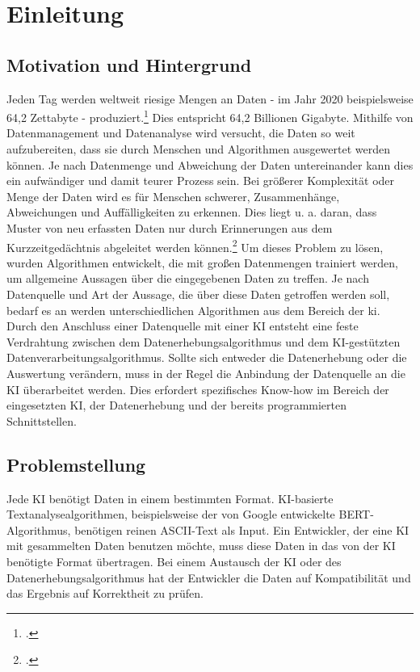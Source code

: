 \section{Einleitung}
\subsection{Motivation und Hintergrund}
Jeden Tag werden weltweit riesige Mengen an Daten - im Jahr 2020 beispielsweise 64,2 Zettabyte - produziert.\footcite{statista2022daten} Dies entspricht 64,2 Billionen Gigabyte. Mithilfe von Datenmanagement und Datenanalyse wird versucht, die Daten so weit aufzubereiten, dass sie durch Menschen und Algorithmen ausgewertet werden können. Je nach Datenmenge und Abweichung der Daten untereinander kann dies ein aufwändiger und damit teurer Prozess sein. Bei größerer Komplexität oder Menge der Daten wird es für Menschen schwerer, Zusammenhänge, Abweichungen und Auffälligkeiten zu erkennen. Dies liegt u. a. daran, dass Muster von neu erfassten Daten nur durch Erinnerungen aus dem Kurzzeitgedächtnis abgeleitet werden können.\footcite{snyder2000music} Um dieses Problem zu lösen, wurden Algorithmen entwickelt, die mit großen Datenmengen trainiert werden, um allgemeine Aussagen über die eingegebenen Daten zu treffen. Je nach Datenquelle und Art der Aussage, die über diese Daten getroffen werden soll, bedarf es an werden unterschiedlichen Algorithmen aus dem Bereich der \ac{ki}. Durch den Anschluss  einer Datenquelle mit einer KI entsteht eine feste Verdrahtung zwischen dem Datenerhebungsalgorithmus und dem KI-gestützten Datenverarbeitungsalgorithmus. Sollte sich entweder die Datenerhebung oder die Auswertung verändern, muss in der Regel die Anbindung der Datenquelle an die KI überarbeitet werden. Dies erfordert spezifisches Know-how im Bereich der eingesetzten KI, der Datenerhebung und der bereits programmierten Schnittstellen.

\subsection{Problemstellung}
Jede KI benötigt Daten in einem bestimmten Format. KI-basierte Textanalysealgorithmen, beispielsweise der von Google entwickelte BERT-Algorithmus, benötigen reinen ASCII-Text als Input. Ein Entwickler, der eine KI mit gesammelten Daten benutzen möchte, muss diese Daten in das von der KI benötigte Format übertragen. Bei einem Austausch der KI oder des Datenerhebungsalgorithmus hat der Entwickler die Daten auf Kompatibilität und das Ergebnis auf Korrektheit zu prüfen.

